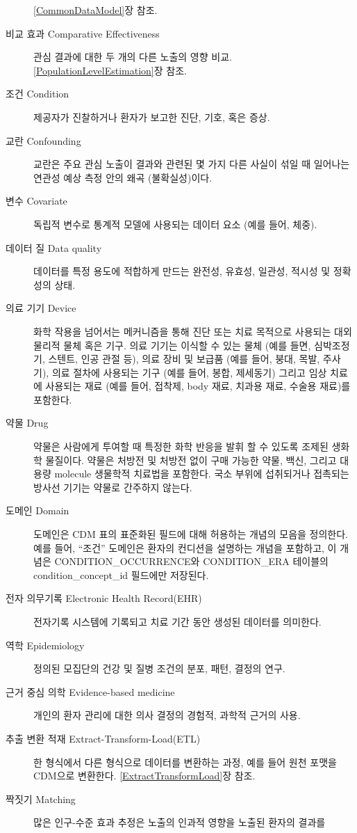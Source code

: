 \documentclass[10.5pt]{book}
\theoremstyle{definition}
\theoremstyle{definition}
\theoremstyle{definition}
\theoremstyle{remark}
\begin{document}
\begin{description}
\ref{CommonDataModel}장 참조.
\item[비교 효과 Comparative Effectiveness]
관심 결과에 대한 두 개의 다른 노출의 영향 비교.
\ref{PopulationLevelEstimation}장 참조.
\item[조건 Condition]
제공자가 진찰하거나 환자가 보고한 진단, 기호, 혹은 증상.
\item[교란 Confounding]
교란은 주요 관심 노출이 결과와 관련된 몇 가지 다른 사실이 섞일 때
일어나는 연관성 예상 측정 안의 왜곡 (불확실성)이다.
\item[변수 Covariate]
독립적 변수로 통계적 모델에 사용되는 데이터 요소 (예를 들어, 체중).
\item[데이터 질 Data quality]
데이터를 특정 용도에 적합하게 만드는 완전성, 유효성, 일관성, 적시성 및
정확성의 상태.
\item[의료 기기 Device]
화학 작용을 넘어서는 메커니즘을 통해 진단 또는 치료 목적으로 사용되는
대외 물리적 물체 혹은 기구. 의료 기기는 이식할 수 있는 물체 (예를 들면,
심박조정기, 스텐트, 인공 관절 등), 의료 장비 및 보급품 (예를 들어, 붕대,
목발, 주사기), 의료 절차에 사용되는 기구 (예를 들어, 봉합, 제세동기)
그리고 임상 치료에 사용되는 재료 (예를 들어, 접착제, body 재료, 치과용
재료, 수술용 재료)를 포함한다.
\item[약물 Drug]
약물은 사람에게 투여할 때 특정한 화학 반응을 발휘 할 수 있도록 조제된
생화학 물질이다. 약물은 처방전 및 처방전 없이 구매 가능한 약물, 백신,
그리고 대용량 molecule 생물학적 치료법을 포함한다. 국소 부위에
섭취되거나 접촉되는 방사선 기기는 약물로 간주하지 않는다.
\item[도메인 Domain]
도메인은 CDM 표의 표준화된 필드에 대해 허용하는 개념의 모음을 정의한다.
예를 들어, ``조건'' 도메인은 환자의 컨디션을 설명하는 개념을 포함하고,
이 개념은 CONDITION\_OCCURRENCE와 CONDITION\_ERA 테이블의
condition\_concept\_id 필드에만 저장된다.
\item[전자 의무기록 Electronic Health Record(EHR)]
전자기록 시스템에 기록되고 치료 기간 동안 생성된 데이터를 의미한다.
\item[역학 Epidemiology]
정의된 모집단의 건강 및 질병 조건의 분포, 패턴, 결정의 연구.
\item[근거 중심 의학 Evidence-based medicine]
개인의 환자 관리에 대한 의사 결정의 경험적, 과학적 근거의 사용.
\item[추출 변환 적재 Extract-Transform-Load(ETL)]
한 형식에서 다른 형식으로 데이터를 변환하는 과정, 예를 들어 원천 포맷을
CDM으로 변환한다. \ref{ExtractTransformLoad}장 참조.
\item[짝짓기 Matching]
많은 인구-수준 효과 추정은 노출의 인과적 영향을 노출된 환자의 결과를

\end{description}
\end{document}
